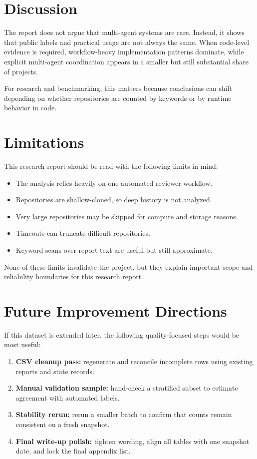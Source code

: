 \documentclass[12pt,a4paper,onecolumn]{article}
\begin{document}
\section{Discussion}
The report does not argue that multi-agent systems are rare. Instead, it shows that public labels and practical usage are not always the same. When code-level evidence is required, workflow-heavy implementation patterns dominate, while explicit multi-agent coordination appears in a smaller but still substantial share of projects.

For research and benchmarking, this matters because conclusions can shift depending on whether repositories are counted by keywords or by runtime behavior in code.

\section{Limitations}
This research report should be read with the following limits in mind:
\begin{itemize}
  \item The analysis relies heavily on one automated reviewer workflow.
  \item Repositories are shallow-cloned, so deep history is not analyzed.
  \item Very large repositories may be skipped for compute and storage reasons.
  \item Timeouts can truncate difficult repositories.
  \item Keyword scans over report text are useful but still approximate.
\end{itemize}

None of these limits invalidate the project, but they explain important scope and reliability boundaries for this research report.

\section{Future Improvement Directions}
If this dataset is extended later, the following quality-focused steps would be most useful:
\begin{enumerate}
  \item \textbf{CSV cleanup pass:} regenerate and reconcile incomplete rows using existing reports and state records.
  \item \textbf{Manual validation sample:} hand-check a stratified subset to estimate agreement with automated labels.
  \item \textbf{Stability rerun:} rerun a smaller batch to confirm that counts remain consistent on a fresh snapshot.
  \item \textbf{Final write-up polish:} tighten wording, align all tables with one snapshot date, and lock the final appendix list.
\end{enumerate}
\end{document}
